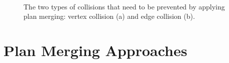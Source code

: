 \documentclass{llncs}
\begin{document}
\begin{figure}[!h]
  \centering
  \quad
  \\
  \caption{The two types of collisions that need to be prevented by applying plan merging: vertex collision (a) and edge collision (b).}
  \label{fig2}
\end{figure}

\newpage

\section{Plan Merging Approaches}
\end{document}
